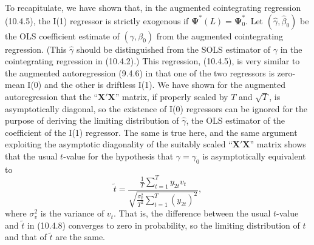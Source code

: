 To recapitulate, we have shown that, in the augmented cointegrating regression
(10.4.5), the I(1) regressor is strictly exogenous if $\boldsymbol{\Psi}^*(L) = \boldsymbol{\Psi}_0^*$. Let
$(\hat{\gamma}, \hat{\beta}_0)$ be
the OLS coefficient estimate of $(\gamma, \beta_0)$ from the augmented cointegrating regres\-sion.
(This $\hat{\gamma}$ should be distinguished from the SOLS estimator of $\gamma$ in the coin\-tegrating
regression in (10.4.2).) This regression, (10.4.5), is very similar to the
augmented autoregression (9.4.6) in that one of the two regressors is zero-mean
I(0) and the other is driftless I(1). We have shown for the augmented
autoregression that the ``$\mathbf{X}'\mathbf{X}$'' matrix, if properly scaled by $T$ and $\sqrt{T}$, is asymptotically
diagonal, so the existence of I(0) regressors can be ignored for the purpose of
deriving the limiting distribution of $\hat{\gamma}$, the OLS estimator of the coefficient of the
I(1) regressor. The same is true here, and the same argument exploiting the asymp\-totic
diagonality of the suitably scaled ``$\mathbf{X}'\mathbf{X}$'' matrix shows that the usual $t$-value
for the hypothesis that $\gamma = \gamma_0$ is asymptotically equivalent to
\begin{equation}
  \tilde{t}
  = \frac{\displaystyle \frac{1}{T} \sum_{t=1}^{T} y_{2t} v_t}
         {\displaystyle \sqrt{\frac{\sigma_v^2}{T^2}
           \sum_{t=1}^{T} (y_{2t})^2}},
  \label{eq:10.4.8} \tag{10.4.8}
\end{equation}
where $\sigma_v^2$ is the variance of $v_t$. That is, the difference between the usual $t$-value
and $\tilde{t}$ in (10.4.8) converges to zero in probability, so the limiting distribution of $t$
and that of $\tilde{t}$ are the same.

